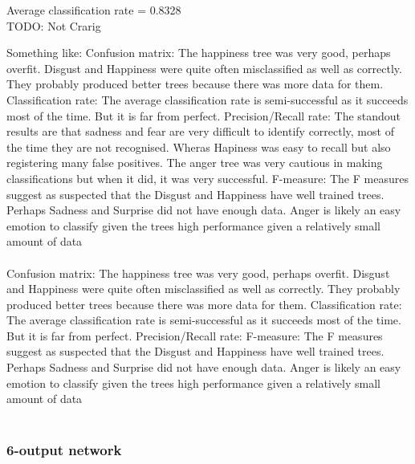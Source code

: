 \documentclass[12pt]{article}
\begin{document}
Average classification rate = 0.8328 \\ 

TODO: Not Crarig

Something like:
Confusion matrix: The happiness tree was very good, perhaps overfit. Disgust and Happiness were quite often misclassified as well as correctly. They probably produced better trees because there was more data for them. Classification rate: The average classification rate is semi-successful as it succeeds most of the time. But it is far from perfect. Precision/Recall rate: The standout results are that sadness and fear are very difficult to identify correctly, most of the time they are not recognised. Wheras Hapiness was easy to recall but also registering many false positives. The anger tree was very cautious in making classifications but when it did, it was very successful.  F-measure: The F measures suggest as suspected that the Disgust and Happiness have well trained trees. Perhaps Sadness and Surprise did not have enough data. Anger is likely an easy emotion to classify given the trees high performance given a relatively small amount of data \\ \\

Confusion matrix: The happiness tree was very good, perhaps overfit. Disgust and Happiness were quite often misclassified as well as correctly. They probably produced better trees because there was more data for them. Classification rate: The average classification rate is semi-successful as it succeeds most of the time. But it is far from perfect. Precision/Recall rate:  F-measure: The F measures suggest as suspected that the Disgust and Happiness have well trained trees. Perhaps Sadness and Surprise did not have enough data. Anger is likely an easy emotion to classify given the trees high performance given a relatively small amount of data \\ \\


\subsubsection*{6-output network}
\end{document}
